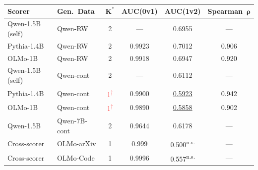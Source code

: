 {\small
\begin{tabular}{llcccc}
\toprule
\textbf{Scorer} & \textbf{Gen.\ Data} & $\boldsymbol{K^*}$ & \textbf{AUC(0v1)} & \textbf{AUC(1v2)} & \textbf{Spearman}~$\boldsymbol{\rho}$ \\
\midrule
Qwen-1.5B (self) & Qwen-RW & 2 & --- & 0.6955 & --- \\
Pythia-1.4B       & Qwen-RW & 2 & 0.9923 & 0.7012 & 0.906 \\
OLMo-1B           & Qwen-RW & 2 & 0.9918 & 0.6947 & 0.920 \\
\midrule
Qwen-1.5B (self) & Qwen-cont & 2 & --- & 0.6112 & --- \\
Pythia-1.4B       & Qwen-cont & \textcolor{red}{1\textsuperscript{$\dagger$}} & 0.9900 & \underline{0.5923} & 0.942 \\
OLMo-1B           & Qwen-cont & \textcolor{red}{1\textsuperscript{$\dagger$}} & 0.9890 & \underline{0.5858} & 0.902 \\
\midrule
Qwen-1.5B        & Qwen-7B-cont & 2 & 0.9644 & 0.6178 & --- \\
\midrule
Cross-scorer      & OLMo-arXiv   & 1 & 0.999  & 0.500\textsuperscript{n.s.} & --- \\
Cross-scorer      & OLMo-Code    & 1 & 0.9996 & 0.557\textsuperscript{n.s.} & --- \\
\bottomrule
\end{tabular}
}
